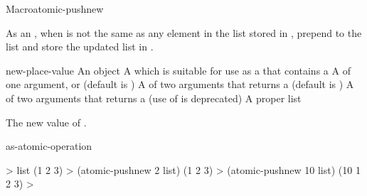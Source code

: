 \documentclass[10pt,twoside,english,pdftex]{article}
\begin{document}
\begin{functiondoc}{Macro}{atomic-pushnew}{ 
    }
%

\fnsyntax

\fnpurpose As an , when  is not
the same as any element in the list stored in , prepend
 to the list and store the updated list in .

\fnpackage {}

\fnmodule {}

\fnargs
\begin{args}{new-place-value}
\arg[item] An object
\arg[place] A  which is suitable for use as a
 that contains a  
\arg[key] A  of one argument, or \nil{} (default is \nil)
\arg[test] A  of two arguments that returns a
 (default is ) 
 A  of two arguments that returns a
 (use of  is deprecated)
 A proper list
\end{args}

\fnreturns The new value of . 

\begin{alsos}{as-atomic-operation}
\end{alsos}

\fnexamples
%
\W\supp
\begin{example}
  > list
  (1 2 3)
  > (atomic-pushnew 2 list)
  (1 2 3)
  > (atomic-pushnew 10 list)
  (10 1 2 3)
  >
\end{example}

\end{functiondoc}

\end{document}
